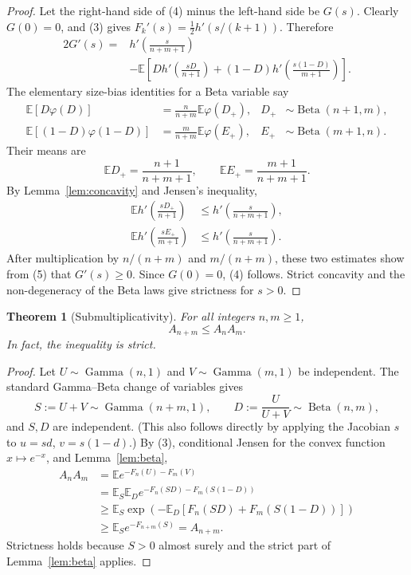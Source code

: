 \documentclass[11pt]{article}
\newtheorem{theorem}{Theorem}
\newcommand{\E}{\mathbb E}
\begin{document}
\begin{proof}
Let the right-hand side of (4) minus the left-hand side be $G(s)$.  Clearly
$G(0)=0$, and (3) gives $F_k'(s)=\tfrac12h'(s/(k+1))$.  Therefore
\begin{align*}
  2G'(s)
  ={}&h'\!\left(\frac{s}{n+m+1}\right)\\
   &-\E\left[D h'\!\left(\frac{sD}{n+1}\right)
      +(1-D)h'\!\left(\frac{s(1-D)}{m+1}\right)\right]. \tag{5}
\end{align*}
The elementary size-bias identities for a Beta variable say
\begin{align*}
 \E[D\varphi(D)]
   &=\frac{n}{n+m}\E\varphi(D_+),
   &D_+&\sim\operatorname{Beta}(n+1,m),\\
 \E[(1-D)\varphi(1-D)]
   &=\frac{m}{n+m}\E\varphi(E_+),
   &E_+&\sim\operatorname{Beta}(m+1,n).
\end{align*}
Their means are
\[
  \E D_+=\frac{n+1}{n+m+1},
  \qquad
  \E E_+=\frac{m+1}{n+m+1}.
\]
By Lemma~\ref{lem:concavity} and Jensen's inequality,
\begin{align*}
 \E h'\!\left(\frac{sD_+}{n+1}\right)
 &\leq h'\!\left(\frac{s}{n+m+1}\right),\\
 \E h'\!\left(\frac{sE_+}{m+1}\right)
 &\leq h'\!\left(\frac{s}{n+m+1}\right).
\end{align*}
After multiplication by $n/(n+m)$ and $m/(n+m)$, these two estimates show
from (5) that $G'(s)\geq0$.  Since $G(0)=0$, (4) follows.  Strict concavity
and the non-degeneracy of the Beta laws give strictness for $s>0$.
\end{proof}

\begin{theorem}[Submultiplicativity]\label{thm:submult}
For all integers $n,m\geq1$,
\[
  A_{n+m}\leq A_nA_m.                                   \tag{6}
\]
In fact, the inequality is strict.
\end{theorem}

\begin{proof}
Let $U\sim\operatorname{Gamma}(n,1)$ and
$V\sim\operatorname{Gamma}(m,1)$ be independent.  The standard
Gamma--Beta change of variables gives
\[
  S:=U+V\sim\operatorname{Gamma}(n+m,1),\qquad
  D:=\frac{U}{U+V}\sim\operatorname{Beta}(n,m),
\]
and $S,D$ are independent.  (This also follows directly by applying the
Jacobian $s$ to $u=sd$, $v=s(1-d)$.)  By (3), conditional Jensen for the
convex function $x\mapsto e^{-x}$, and Lemma~\ref{lem:beta},
\begin{align*}
 A_nA_m
 &=\E e^{-F_n(U)-F_m(V)}\\
 &=\E_S\E_D e^{-F_n(SD)-F_m(S(1-D))}\\
 &\geq\E_S\exp\left(-\E_D[F_n(SD)+F_m(S(1-D))]\right)\\
 &\geq\E_S e^{-F_{n+m}(S)}
 =A_{n+m}.
\end{align*}
Strictness holds because $S>0$ almost surely and the strict part of
Lemma~\ref{lem:beta} applies.
\end{proof}
\end{document}
